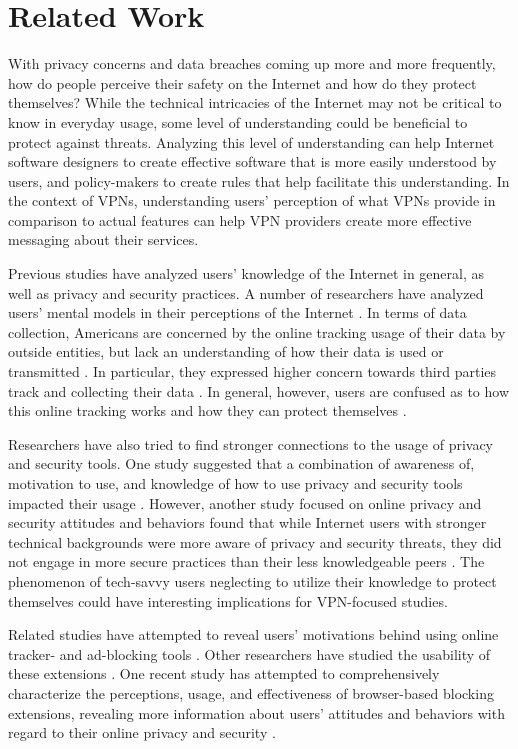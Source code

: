 \section{Related Work}\label{sec:related}

With privacy concerns and data breaches coming up more and more frequently,
how do people perceive their safety on the Internet and how do they protect
themselves? While the technical intricacies of the Internet may not be
critical to know in everyday usage, some level of understanding could be
beneficial to protect against threats. Analyzing this level of understanding
can help Internet software designers to create effective software that is more
easily understood by users, and policy-makers to create rules that help
facilitate this understanding. In the context of VPNs, understanding users'
perception of what VPNs provide in comparison to actual features can help VPN
providers create more effective messaging about their services.

Previous studies have analyzed users' knowledge of the Internet in general, as
well as privacy and security practices. A number of researchers have analyzed
users' mental models in their perceptions of the Internet \cite{klasnja_16, poole_17}. In terms
of data collection, Americans are concerned by the online tracking usage of
their data by outside entities, but lack an understanding of how their data is
used or transmitted \cite{smith_18, turow_19}. In particular, they expressed higher concern
towards third parties track and collecting their data \cite{rader_8}. In general,
however, users are confused as to how this online tracking works and how they
can protect themselves \cite{shirazi_9}.

Researchers have also tried to find stronger connections to the usage of
privacy and security tools. One study suggested that a combination of
awareness of, motivation to use, and knowledge of how to use privacy and
security tools impacted their usage \cite{das_20}. However, another study focused on
online privacy and security attitudes and behaviors found that while Internet
users with stronger technical backgrounds were more aware of privacy and
security threats, they did not engage in more secure practices than their less
knowledgeable peers \cite{kang_2}. The phenomenon of tech-savvy users neglecting to
utilize their knowledge to protect themselves could have interesting
implications for VPN-focused studies.

Related studies have attempted to reveal users' motivations behind using
online tracker- and ad-blocking tools \cite{cortland_11, mobileadblock_12, an_13}. Other researchers have
studied the usability of these extensions \cite{leon_14, schaub_15}. One recent study has
attempted to comprehensively characterize the perceptions, usage, and
effectiveness of browser-based blocking extensions, revealing more information
about users' attitudes and behaviors with regard to their online privacy and
security \cite{mathur_5}.

